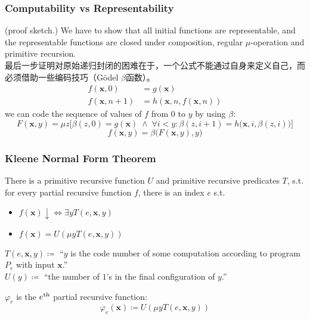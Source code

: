 \documentclass[UTF8,11pt,colorlinks,compress,openany]{beamer}%
\begin{document}
\begin{frame}\frametitle{Computability vs Representability}
\begin{center}
\end{center}
(proof sketch.) We have to show that all initial functions are representable, and the representable functions are closed under composition, regular $\mu$-operation and primitive recursion.\\
最后一步证明对原始递归封闭的困难在于，一个公式不能通过自身来定义自己，而必须借助一些编码技巧（G\"odel $\beta$函数）。
		\begin{align*}
		f(\mathbf{x},0)&=g(\mathbf{x})\\
		f(\mathbf{x},n+1)&=h\left(\mathbf{x},n,f(\mathbf{x},n)\right)
		\end{align*}
we can code the sequence of values of $f$ from $0$ to $y$ by using $\beta$:
\[F(\mathbf{x},y)=\mu z\big[\beta(z,0)=g(\mathbf{x})\;\wedge\;\forall i<y:\beta(z,i+1)=h\big(\mathbf{x},i,\beta(z,i)\big)\big]\]
\[f(\mathbf{x},y)=\beta\big(F(\mathbf{x},y),y\big)\]
\end{frame}

\begin{frame}\frametitle{Kleene Normal Form Theorem}
	\begin{theorem}
		There is a primitive recursive function $U$ and primitive recursive predicates $T$, s.t. for every partial recursive function $f$, there is an index $e$ s.t.
		\begin{itemize}
			\item $f(\mathbf{x})\!\downarrow\iff\exists y T(e,\mathbf{x},y)$
			\item $f(\mathbf{x})=U(\mu y T(e,\mathbf{x},y))$
		\end{itemize}
	\end{theorem}
	\begin{block}{}
		$T(e,\mathbf{x}, y)\coloneqq $ ``$y$ is the code	number of some computation according to program $P_e$ with input $\mathbf{x}$.''\\
		$U(y)\coloneqq $ ``the number of $1$'s in the final configuration of $y$.''
	\end{block}
	\begin{definition}
		$\varphi_e$ is the $e\textsuperscript{th}$ partial recursive function:
		\[\varphi_e(\mathbf{x})\coloneqq U(\mu y T(e,\mathbf{x},y))\]
	\end{definition}
\end{frame}
\end{document}
